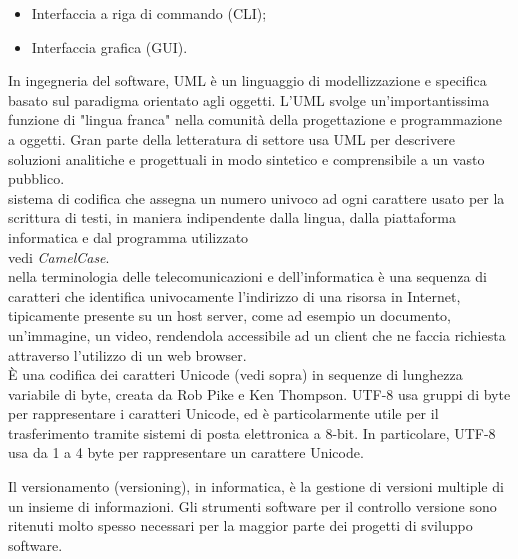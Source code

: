 \documentclass{scalatekids-article}
\begin{document}
  \begin{itemize}
  \item Interfaccia a riga di commando (CLI);
  \item Interfaccia grafica (GUI).
  \end{itemize}
  
   In ingegneria del software, UML è un linguaggio di modellizzazione e specifica basato sul paradigma orientato agli oggetti.
  L'UML svolge un'importantissima funzione di "lingua franca" nella comunità della progettazione e programmazione a oggetti. Gran parte della letteratura di settore usa UML per descrivere soluzioni analitiche e progettuali in modo sintetico e comprensibile a un vasto pubblico.
  \\
  
    sistema di codifica che assegna un numero univoco ad ogni carattere usato per la scrittura di testi, in maniera indipendente dalla lingua, dalla piattaforma informatica e dal programma utilizzato
   \\

   vedi \textit{CamelCase}.
  \\

   nella terminologia delle telecomunicazioni e dell'informatica è una sequenza di caratteri che identifica univocamente l'indirizzo di una risorsa in Internet, tipicamente presente su un host server, come ad esempio un documento, un'immagine, un video, rendendola accessibile ad un client che ne faccia richiesta attraverso l'utilizzo di un web browser.
  \\
  
   È una codifica dei caratteri Unicode (vedi sopra) in sequenze di lunghezza variabile di byte, creata da Rob Pike e Ken Thompson. UTF-8 usa gruppi di byte per rappresentare i caratteri Unicode, ed è particolarmente utile per il trasferimento tramite sistemi di posta elettronica a 8-bit.
  In particolare, UTF-8 usa da 1 a 4 byte per rappresentare un carattere Unicode.
  \\


   Il versionamento (versioning), in informatica, è la gestione di versioni multiple di un insieme di informazioni.
  Gli strumenti software per il controllo versione sono ritenuti molto spesso necessari per la maggior parte dei progetti di sviluppo software.
  \\
\end{document}
